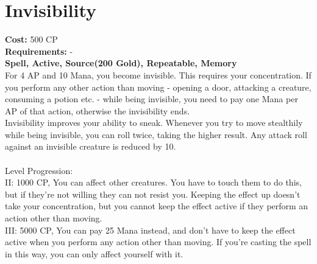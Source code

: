 \section{Invisibility}
\textbf{Cost:} 500 CP\\
\textbf{Requirements:} -\\
\textbf{Spell, Active, Source(200 Gold), Repeatable, Memory}\\
For 4 AP and 10 Mana, you become invisible. This requires your concentration. If you perform any other action than moving - opening a door, attacking a creature, consuming a potion etc. - while being invisible, you need to pay one Mana per AP of that action, otherwise the invisibility ends.\\
Invisibility improves your ability to sneak. Whenever you try to move stealthily while being invisible, you can roll twice, taking the higher result. Any attack roll against an invisible creature is reduced by 10.\\
\\
Level Progression:\\
II: 1000 CP, You can affect other creatures. You have to touch them to do this, but if they're not willing they can not resist you. Keeping the effect up doesn't take your concentration, but you cannot keep the effect active if they perform an action other than moving.\\
III: 5000 CP, You can pay 25 Mana instead, and don't have to keep the effect active when you perform any action other than moving. If you're casting the spell in this way, you can only affect yourself with it.\\
